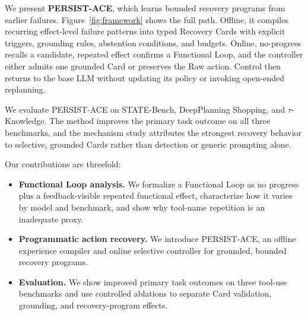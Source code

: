 We present \textbf{PERSIST-ACE}, which learns bounded recovery programs from
earlier failures. Figure~\ref{fig:framework} shows the full path. Offline, it
compiles recurring effect-level failure patterns into typed Recovery Cards
with explicit triggers, grounding rules, abstention conditions, and budgets.
Online, no-progress recalls a candidate, repeated effect confirms a Functional Loop, and
the controller either admits one grounded Card or preserves the Raw action.
Control then returns to the base LLM without updating its policy or invoking
open-ended replanning.

We evaluate PERSIST-ACE on STATE-Bench, DeepPlanning Shopping, and
$\tau$-Knowledge. The method improves the primary task outcome on all three
benchmarks, and the mechanism study attributes the strongest recovery behavior
to selective, grounded Cards rather than detection or generic prompting alone.

Our contributions are threefold:
\begin{itemize}
    \item \textbf{Functional Loop analysis.} We formalize a Functional Loop as no progress
    plus a feedback-visible repeated functional effect, characterize how it
    varies by model and benchmark, and show why tool-name repetition
    is an inadequate proxy.
    \item \textbf{Programmatic action recovery.} We introduce PERSIST-ACE, an
    offline experience compiler and online selective controller for grounded,
    bounded recovery programs.
    \item \textbf{Evaluation.} We show improved primary task outcomes on three
    tool-use benchmarks and use controlled ablations to separate Card
    validation, grounding, and recovery-program effects.
\end{itemize}
